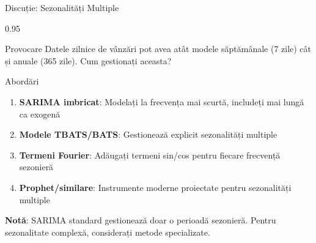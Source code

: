\documentclass[9pt, aspectratio=169, t]{beamer}
\begin{document}
\begin{frame}{Discuție: Sezonalități Multiple}
    \begin{cminipage}{0.95\textwidth}
    \begin{block}{Provocare}
        Datele zilnice de vânzări pot avea atât modele săptămânale (7 zile) cât și anuale (365 zile). Cum gestionați aceasta?
    \end{block}

    \vspace{0.2cm}

    \begin{block}{Abordări}
        \begin{enumerate}\setlength{\itemsep}{0pt}
            \item \textbf{SARIMA imbricat}: Modelați la frecvența mai scurtă, includeți mai lungă ca exogenă
            \item \textbf{Modele TBATS/BATS}: Gestionează explicit sezonalități multiple
            \item \textbf{Termeni Fourier}: Adăugați termeni sin/cos pentru fiecare frecvență sezonieră
            \item \textbf{Prophet/similare}: Instrumente moderne proiectate pentru sezonalități multiple
        \end{enumerate}

        \vspace{0.2cm}
        \textbf{Notă}: SARIMA standard gestionează doar o perioadă sezonieră. Pentru sezonalitate complexă, considerați metode specializate.
    \end{block}
    \end{cminipage}
\end{frame}
\end{document}
